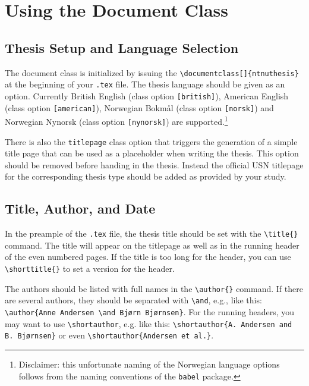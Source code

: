\chapter{Using the Document Class}
\label{chap:usage}

\section{Thesis Setup and Language Selection}
\label{sec:setup}

The document class is initialized by issuing the \texttt{\textbackslash documentclass[]\{ntnuthesis\}} at the beginning of your \texttt{.tex} file. The thesis language should be given as an option. Currently British English (class option \texttt{[british]}), American English (class option \texttt{[american]}), Norwegian Bokmål (class option \texttt{[norsk]}) and Norwegian Nynorsk (class option \texttt{[nynorsk]}) are supported.\footnote{Disclaimer: this unfortunate naming of the Norwegian language options follows from the naming conventions of the \texttt{babel} package.}

There is also the \texttt{titlepage} class option that triggers the generation of a simple title page that can be used as a placeholder when writing the thesis. This option should be removed before handing in the thesis. Instead the official USN titlepage for the corresponding thesis type should be added as provided by your study.

\section{Title, Author, and Date}

In the preample of the \texttt{.tex} file, the thesis title should be set with the \texttt{\textbackslash title\{\}} command. The title will appear on the titlepage as well as in the running header of the even numbered pages. If the title is too long for the header, you can use \texttt{\textbackslash shorttitle\{\}} to set a version for the header.

The authors should be listed with full names in the \texttt{\textbackslash author\{\}} command. If there are several authors, they should be separated with \texttt{\textbackslash and}, e.g., like this: \texttt{\textbackslash author\{Anne Andersen \textbackslash and Bjørn Bjørnsen\}}. For the running headers, you may want to use \texttt{\textbackslash shortauthor}, e.g. like this: \texttt{\textbackslash shortauthor\{A. Andersen and B. Bjørnsen\}} or even \texttt{\textbackslash shortauthor\{Andersen et al.\}}.

